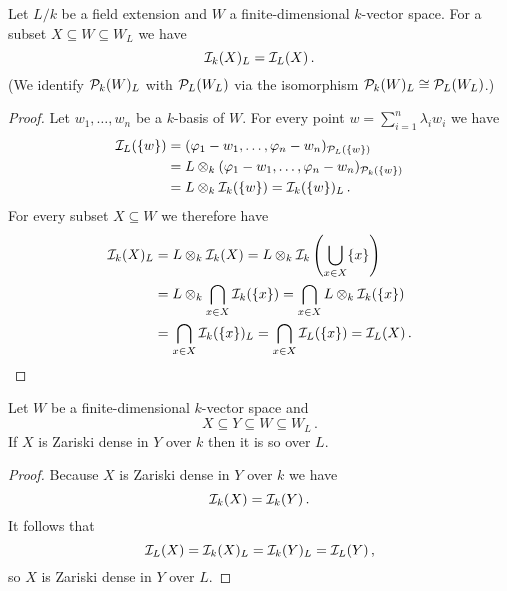 \begin{lem}
  Let $L/k$ be a field extension and $W$ a finite-dimensional $k$-vector space.
  For a subset $X \subseteq W \subseteq W_L$ we have
  \[
      \mathcal{I}_k(X)_L
    = \mathcal{I}_L(X) \,.
  \]
  (We identify $\mathcal{P}_k(W)_L$ with $\mathcal{P}_L(W_L)$ via the isomorphism $\mathcal{P}_k(W)_L \cong \mathcal{P}_L(W_L)$.)
\end{lem}
\begin{proof}
  Let $w_1, \dotsc, w_n$ be a $k$-basis of $W$.
  For every point $w = \sum_{i=1}^n \lambda_i w_i$ we have
  \begin{align*}
        \mathcal{I}_L(\{w\})
    &=  ( \varphi_1 - w_1, \dotsc, \varphi_n - w_n )_{ \mathcal{P}_L(\{w\}) } \\
    &=  L \otimes_k ( \varphi_1 - w_1, \dotsc, \varphi_n - w_n )_{ \mathcal{P}_k(\{w\}) } \\
    &=  L \otimes_k \mathcal{I}_k(\{w\})
     =  \mathcal{I}_k(\{w\})_L \,.
  \end{align*}
  For every subset $X \subseteq W$ we therefore have
  \begin{align*}
        \mathcal{I}_k(X)_L
    &=  L \otimes_k \mathcal{I}_k(X)
     =  L \otimes_k \mathcal{I}_k\left( \bigcup_{x \in X} \{x\} \right) \\
    &=  L \otimes_k \bigcap_{x \in X} \mathcal{I}_k(\{x\})
     =  \bigcap_{x \in X} L \otimes_k \mathcal{I}_k(\{x\}) \\
    &=  \bigcap_{x \in X} \mathcal{I}_k(\{x\})_L
     =  \bigcap_{x \in X} \mathcal{I}_L(\{x\})
     =  \mathcal{I}_L(X) \,.
    \qedhere
  \end{align*}
\end{proof}


\begin{cor}\label{cor: Zariski dense scalar extension}
  Let $W$ be a finite-dimensional $k$-vector space and
  \[
              X
    \subseteq Y
    \subseteq W
    \subseteq W_L \,.
  \]
  If $X$ is Zariski dense in $Y$ over $k$ then it is so over $L$.
\end{cor}
\begin{proof}
  Because $X$ is Zariski dense in $Y$ over $k$ we have
  \[
      \mathcal{I}_k(X)
    = \mathcal{I}_k(Y) \,.
  \]
  It follows that
  \[
      \mathcal{I}_L(X)
    = \mathcal{I}_k(X)_L
    = \mathcal{I}_k(Y)_L
    = \mathcal{I}_L(Y) \,,
  \]
  so $X$ is Zariski dense in $Y$ over $L$.
\end{proof}


